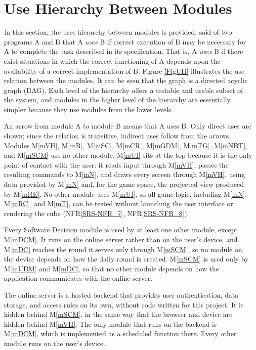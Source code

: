 \documentclass[12pt, titlepage]{article}
\newcommand{\nfrref}[1]{NFR\ref{SRS-#1}}
\newcommand{\mref}[1]{M\ref{#1}}
\begin{document}
\section{Use Hierarchy Between Modules} \label{SecUse}

In this section, the uses hierarchy between modules is
provided. \citet{Parnas1978} said of two programs A and B that A {\em uses} B if
correct execution of B may be necessary for A to complete the task described in
its specification. That is, A {\em uses} B if there exist situations in which
the correct functioning of A depends upon the availability of a correct
implementation of B.  Figure \ref{FigUH} illustrates the use relation between
the modules. It can be seen that the graph is a directed acyclic graph
(DAG). Each level of the hierarchy offers a testable and usable subset of the
system, and modules in the higher level of the hierarchy are essentially simpler
because they use modules from the lower levels.

An arrow from module A to module B means that A uses B. Only direct uses are
shown; since the relation is transitive, indirect uses follow from the arrows.
Modules \mref{mVH}, \mref{mR}, \mref{mSC}, \mref{mCR}, \mref{mGDM},
\mref{mTG}, \mref{mNBT}, and \mref{mSCM} use no other module. \mref{mUI} sits
at the top because it is the only point of contact with the user: it reads
input through \mref{mVH}, passes the resulting commands to \mref{mN}, and
draws every screen through \mref{mVH}, using data provided by \mref{mN} and,
for the game space, the projected view produced by \mref{mRE}. No other module uses
\mref{mUI}, so all game logic, including \mref{mN}, \mref{mRC}, and \mref{mT},
can be tested without launching the user interface or rendering the cube
(\nfrref{NFR_7}, \nfrref{NFR_8}).

Every Software Decision module is used by at least one other module, except
\mref{mDCM}. It runs on the online server rather than on the user's device, and
\mref{mDC} reaches the round it serves only through \mref{mSCM}, so no module on
the device depends on how the daily round is created. \mref{mSCM} is used only
by \mref{mUDM} and \mref{mDC}, so that no other module depends on how the
application communicates with the online server.

The online server is a hosted backend that provides user authentication, data
storage, and access rules on its own, without code written for this project.
It is hidden behind \mref{mSCM}, in the same way that the browser and device
are hidden behind \mref{mVH}. The only module that runs on the backend is
\mref{mDCM}, which is implemented as a scheduled function there. Every other
module runs on the user's device.
\end{document}
